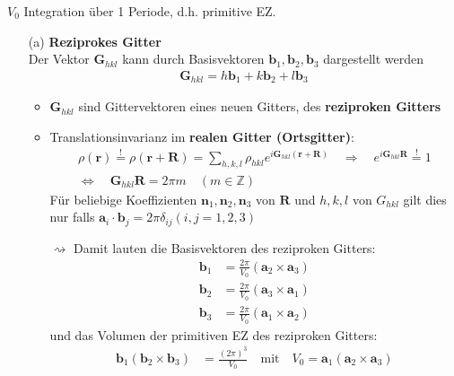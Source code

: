 $V_0$ Integration über 1 Periode, d.h. primitive EZ.
\begin{itemize}
    \item[(a)] \textbf{Reziprokes Gitter}\\
          Der Vektor $\textbf{G}_{hkl}$ kann durch Basisvektoren $\textbf{b}_1, \textbf{b}_2, \textbf{b}_3$ dargestellt werden
          \begin{align*}
              \textbf{G}_{hkl} = h \textbf{b}_1 + k \textbf{b}_2 + l \textbf{b}_3
          \end{align*}
          \begin{itemize}
              \item $\textbf{G}_{hkl}$ sind Gittervektoren eines neuen Gitters, des \textbf{reziproken Gitters}
              \item Translationsinvarianz im \textbf{realen Gitter (Ortsgitter)}:
                    \begin{align*}
                        \rho(\textbf{r})  \overset{!}{=}  \rho(\textbf{r} + \textbf{R}) = \sum_{h,k,l} \rho_{hkl} e^{i \textbf{G}_{hkl} (\textbf{r}+\textbf{R})} \quad \Rightarrow \quad e^{i \textbf{G}_{hkl} \textbf{R}} \overset{!}{=} 1 \\
                        \Leftrightarrow \quad \textbf{G}_{hkl} \textbf{R} = 2 \pi m \quad (m \in \mathbb{Z})
                    \end{align*}
                    Für beliebige Koeffizienten $ \textbf{n}_1, \textbf{n}_2, \textbf{n}_3$ von $\textbf{R}$ und $h,k,l$ von $G_{hkl}$ gilt dies nur  falls $\textbf{a}_i\cdot \textbf{b}_j = 2\pi \delta_{ij} (i,j = 1,2,3)$
                \item[$\rightsquigarrow$] Damit lauten die Basisvektoren des reziproken Gitters:
                \begin{align*}
                    \textbf{b}_1 &= \frac{2 \pi}{V_0} ( \textbf{a}_2 \times \textbf{a}_3)\\
                    \textbf{b}_2 &= \frac{2 \pi}{V_0} ( \textbf{a}_3 \times \textbf{a}_1)\\
                    \textbf{b}_3 &= \frac{2 \pi}{V_0} ( \textbf{a}_1 \times \textbf{a}_2)
                \end{align*}
                und das Volumen der primitiven EZ des reziproken Gitters:
                \begin{align*}
                    \textbf{b}_1 ( \textbf{b}_2 \times \textbf{b}_3) &= \frac{(2 \pi)^3}{V_0} \quad \text{mit} \quad V_0 = \textbf{a}_1 ( \textbf{a}_2 \times \textbf{a}_3)

\end{align*}
\end{itemize}
\end{itemize}
